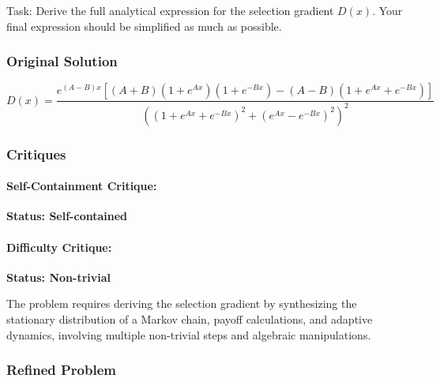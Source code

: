 \documentclass[10pt]{article}
\begin{document}
Task:
Derive the full analytical expression for the selection gradient $D(x)$. Your final expression should be simplified as much as possible.

\subsubsection*{Original Solution}
\[ D(x) = \frac{e^{(A-B)x} \left[ (A+B)(1+e^{Ax})(1+e^{-Bx}) - (A-B)(1+e^{Ax}+e^{-Bx}) \right]}{\left( (1+e^{Ax}+e^{-Bx})^2 + (e^{Ax}-e^{-Bx})^2 \right)^2} \]

\subsubsection*{Critiques}
\paragraph*{Self-Containment Critique:}
\textcolor{pass}{\textbf{Status: Self-contained}}




\paragraph*{Difficulty Critique:}
\textcolor{pass}{\textbf{Status: Non-trivial}}

The problem requires deriving the selection gradient by synthesizing the stationary distribution of a Markov chain, payoff calculations, and adaptive dynamics, involving multiple non-trivial steps and algebraic manipulations.


\subsubsection*{Refined Problem}
\end{document}
